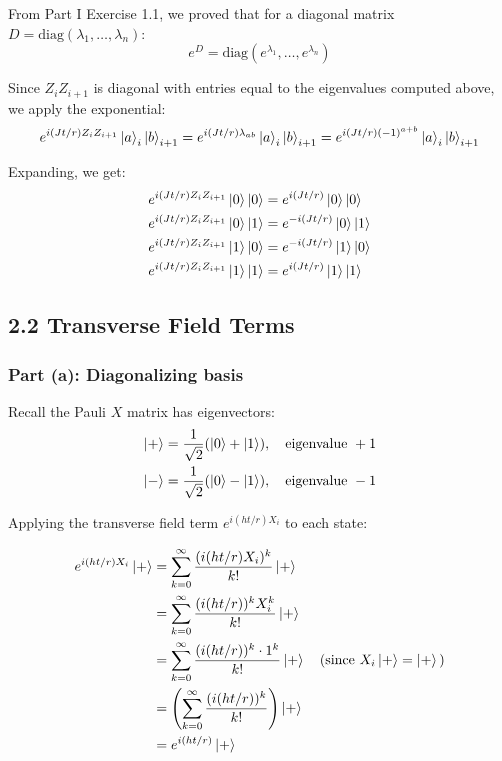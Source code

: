 \documentclass[11pt]{article}
\begin{document}
From Part I Exercise 1.1, we proved that for a diagonal matrix $D = \text{diag}(\lambda_1, \ldots, \lambda_n)$:
\begin{equation}
e^D = \text{diag}(e^{\lambda_1}, \ldots, e^{\lambda_n})
\end{equation}

Since $Z_i Z_{i+1}$ is diagonal with entries equal to the eigenvalues computed above, we apply the exponential:
\begin{equation}
e^{i(Jt/r) Z_i Z_{i+1}} \ket{a}_i \ket{b}_{i+1} = e^{i(Jt/r) \lambda_{ab}} \ket{a}_i \ket{b}_{i+1} = e^{i(Jt/r)(-1)^{a+b}} \ket{a}_i \ket{b}_{i+1}
\end{equation}

Expanding, we get:
\begin{align}
e^{i(Jt/r) Z_i Z_{i+1}} \ket{0}\ket{0} &= e^{i(Jt/r)} \ket{0}\ket{0} \\
e^{i(Jt/r) Z_i Z_{i+1}} \ket{0}\ket{1} &= e^{-i(Jt/r)} \ket{0}\ket{1} \\
e^{i(Jt/r) Z_i Z_{i+1}} \ket{1}\ket{0} &= e^{-i(Jt/r)} \ket{1}\ket{0} \\
e^{i(Jt/r) Z_i Z_{i+1}} \ket{1}\ket{1} &= e^{i(Jt/r)} \ket{1}\ket{1}
\end{align}

\subsection*{2.2 Transverse Field Terms}

\subsubsection*{Part (a): Diagonalizing basis}

Recall the Pauli $X$ matrix has eigenvectors:
\begin{align}
\ket{+} &= \frac{1}{\sqrt{2}}(\ket{0} + \ket{1}), \quad \text{eigenvalue } +1 \\
\ket{-} &= \frac{1}{\sqrt{2}}(\ket{0} - \ket{1}), \quad \text{eigenvalue } -1
\end{align}

Applying the transverse field term $e^{i(ht/r) X_i}$ to each state:

\begin{align}
e^{i(ht/r) X_i} \ket{+} &= \sum_{k=0}^{\infty} \frac{(i(ht/r) X_i)^k}{k!} \ket{+} \\
&= \sum_{k=0}^{\infty} \frac{(i(ht/r))^k X_i^k}{k!} \ket{+} \\
&= \sum_{k=0}^{\infty} \frac{(i(ht/r))^k \cdot 1^k}{k!} \ket{+} \quad \text{(since } X_i\ket{+} = \ket{+}\text{)} \\
&= \left(\sum_{k=0}^{\infty} \frac{(i(ht/r))^k}{k!}\right) \ket{+} \\
&= e^{i(ht/r)} \ket{+}
\end{align}
\end{document}
